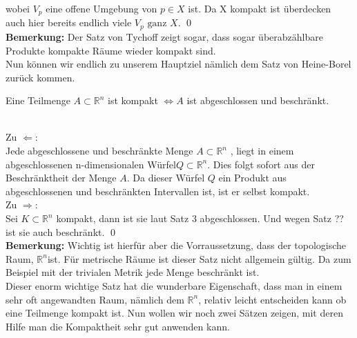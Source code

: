 	wobei \( V_{p} \) eine offene Umgebung von \( p \in X \) ist. Da X kompakt ist überdecken auch hier bereits endlich viele \(V_{p} \mbox{ ganz } X \). 
	\qed
	\\
	{\bf Bemerkung:} Der Satz von Tychoff zeigt sogar, dass sogar überabzählbare Produkte kompakte Räume wieder kompakt sind. \\
	Nun können wir endlich zu unserem Hauptziel nämlich dem Satz von Heine-Borel zurück kommen.\\
	\begin{Satz}
		Eine Teilmenge  \( A \subset \mathbb{R}^n \) ist kompakt \(\Leftrightarrow A \) ist abgeschlossen und beschränkt.
	\end{Satz}
	 \\
		Zu \(\Leftarrow \): \\
		Jede abgeschlossene und beschränkte Menge \(A \subset\mathbb{R}^n \) , liegt in einem abgeschlossenen n-dimensionalen Würfel\( Q \subset \mathbb{R}^n \). Dies folgt sofort aus der 
		Beschränktheit der Menge \(A\). Da dieser Würfel \( Q \) ein Produkt aus abgeschlossenen und beschränkten Intervallen ist, ist er selbst kompakt.
		\\
		Zu \(\Rightarrow \): \\
		Sei \( K \subset \mathbb{R}^n \) kompakt, dann ist sie laut Satz 3 abgeschlossen. Und wegen Satz ?? ist sie auch beschränkt.
	\qed \\
	{\bf Bemerkung:} Wichtig ist hierfür aber die Vorraussetzung, dass der topologische Raum, \(\mathbb{R}^n \)ist. Für metrische Räume ist dieser Satz nicht allgemein gültig. 
	Da zum Beispiel mit der trivialen Metrik jede Menge beschränkt ist.\\
	Dieser enorm wichtige Satz hat die wunderbare Eigenschaft, dass man in einem sehr oft angewandten Raum, nämlich dem \(\mathbb{R}^n \), 
	relativ leicht entscheiden kann ob eine Teilmenge kompakt ist.  Nun wollen wir noch zwei Sätzen zeigen, mit deren Hilfe man die Kompaktheit sehr gut anwenden kann.
	